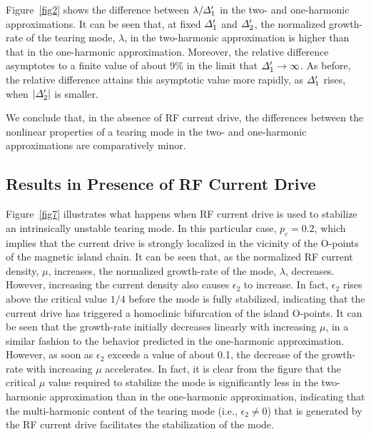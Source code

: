 \documentclass[12pt,prb,aps]{revtex4-1}
\begin{document}
Figure~\ref{fig2} shows the
difference between $\lambda/{\mit\Delta}_1'$ in the two- and one-harmonic approximations. It can be seen that, at fixed ${\mit\Delta}_1'$ and ${\mit\Delta}_2'$, the
normalized growth-rate of the tearing mode, $\lambda$,  in the two-harmonic approximation is higher than that in the one-harmonic
approximation. Moreover, the relative difference asymptotes to a finite value of about 9\% in the limit that 
${\mit\Delta}_1'\rightarrow \infty$. As before,  the relative difference attains this asymptotic value more rapidly, as ${\mit\Delta}_1'$ rises, 
when $|{\mit\Delta}_2'|$ is smaller. 

We conclude that, in the absence of RF current drive, the differences between the nonlinear properties
of a tearing mode in the two- and one-harmonic approximations are comparatively minor. 

\subsection{Results in Presence of RF Current Drive}
Figure~\ref{fig7} illustrates what happens when RF current drive is used to stabilize an intrinsically unstable tearing mode. In this particular case, $p_c=0.2$, which implies that the current drive is strongly localized in the vicinity of
the O-points of the magnetic island chain. It can be seen that, as the normalized RF current density, $\mu$, increases,
the normalized growth-rate of the mode, $\lambda$, decreases. However,  increasing the current
density also causes $\epsilon_2$ to increase. In fact, $\epsilon_2$ rises above the critical value $1/4$ before the
mode is fully stabilized, indicating that the current drive has triggered a homoclinic bifurcation of the island O-points. 
It can be seen that the growth-rate initially decreases linearly with increasing $\mu$, in a similar fashion to the behavior predicted in the one-harmonic approximation. However, as soon as $\epsilon_2$ exceeds a value of about 0.1, the
decrease of the growth-rate with increasing $\mu$ accelerates. In fact, it is clear from the figure that
the critical $\mu$ value required to stabilize the mode is significantly less in the two-harmonic approximation than in the
one-harmonic approximation, indicating that the multi-harmonic content of the tearing mode (i.e., $\epsilon_2\neq 0$) that is
generated by the RF current drive facilitates the stabilization of the mode. 
\end{document}
